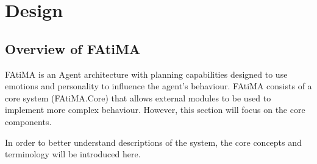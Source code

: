 \documentclass{article}
\begin{document}
\section{Design}

\subsection{Overview of FAtiMA}

FAtiMA is an Agent architecture with planning capabilities designed to use emotions
and personality to influence the agent's behaviour\cite{Mascarenhas}.  FAtiMA consists
of a core system (FAtiMA.Core) that allows external modules to be used to implement more
complex behaviour.  However, this section will focus on the core components.

In order to better understand descriptions of the system, the core concepts and 
terminology will be introduced here.
\end{document}

